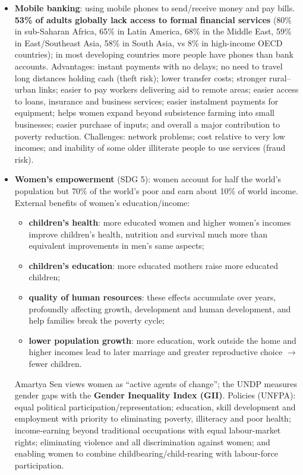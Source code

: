 \documentclass[a4paper,12pt]{article}
\begin{document}
\begin{itemize}
\begin{itemize}
    \item A well-known example is the \textbf{Grameen Bank} in Bangladesh, which provides credit to poor people without collateral.
  \end{itemize}
  \item \textbf{Mobile banking}: using mobile phones to send/receive money and pay bills. \textbf{53\% of adults globally lack access to formal financial services} (80\% in sub-Saharan Africa, 65\% in Latin America, 68\% in the Middle East, 59\% in East/Southeast Asia, 58\% in South Asia, vs 8\% in high-income OECD countries); in most developing countries more people have phones than bank accounts. Advantages: instant payments with no delays; no need to travel long distances holding cash (theft risk); lower transfer costs; stronger rural--urban links; easier to pay workers delivering aid to remote areas; easier access to loans, insurance and business services; easier instalment payments for equipment; helps women expand beyond subsistence farming into small businesses; easier purchase of inputs; and overall a major contribution to poverty reduction. Challenges: network problems; cost relative to very low incomes; and inability of some older illiterate people to use services (fraud risk).
  \item \textbf{Women's empowerment} (SDG 5): women account for half the world's population but 70\% of the world's poor and earn about 10\% of world income. External benefits of women's education/income:
  \begin{itemize}
    \item \textbf{children's health}: more educated women and higher women's incomes improve children's health, nutrition and survival much more than equivalent improvements in men's same aspects;
    \item \textbf{children's education}: more educated mothers raise more educated children;
    \item \textbf{quality of human resources}: these effects accumulate over years, profoundly affecting growth, development and human development, and help families break the poverty cycle;
    \item \textbf{lower population growth}: more education, work outside the home and higher incomes lead to later marriage and greater reproductive choice $\to$ fewer children.
  \end{itemize}
  Amartya Sen views women as ``active agents of change''; the UNDP measures gender gaps with the \textbf{Gender Inequality Index (GII)}. Policies (UNFPA): equal political participation/representation; education, skill development and employment with priority to eliminating poverty, illiteracy and poor health; income-earning beyond traditional occupations with equal labour-market rights; eliminating violence and all discrimination against women; and enabling women to combine childbearing/child-rearing with labour-force participation.

\end{itemize}
\end{document}
